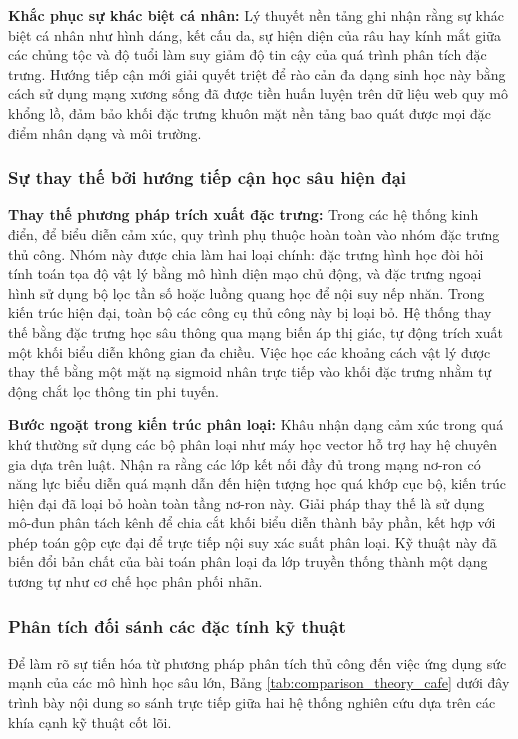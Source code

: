 \textbf{Khắc phục sự khác biệt cá nhân:}
Lý thuyết nền tảng ghi nhận rằng sự khác biệt cá nhân như hình dáng, kết cấu da, sự hiện diện của râu hay kính mắt giữa các chủng tộc và độ tuổi làm suy giảm độ tin cậy của quá trình phân tích đặc trưng. Hướng tiếp cận mới giải quyết triệt để rào cản đa dạng sinh học này bằng cách sử dụng mạng xương sống đã được tiền huấn luyện trên dữ liệu web quy mô khổng lồ, đảm bảo khối đặc trưng khuôn mặt nền tảng bao quát được mọi đặc điểm nhân dạng và môi trường.

\subsubsection{Sự thay thế bởi hướng tiếp cận học sâu hiện đại}

\textbf{Thay thế phương pháp trích xuất đặc trưng:}
Trong các hệ thống kinh điển, để biểu diễn cảm xúc, quy trình phụ thuộc hoàn toàn vào nhóm đặc trưng thủ công. Nhóm này được chia làm hai loại chính: đặc trưng hình học đòi hỏi tính toán tọa độ vật lý bằng mô hình diện mạo chủ động, và đặc trưng ngoại hình sử dụng bộ lọc tần số hoặc luồng quang học để nội suy nếp nhăn. Trong kiến trúc hiện đại, toàn bộ các công cụ thủ công này bị loại bỏ. Hệ thống thay thế bằng đặc trưng học sâu thông qua mạng biến áp thị giác, tự động trích xuất một khối biểu diễn không gian đa chiều. Việc học các khoảng cách vật lý được thay thế bằng một mặt nạ sigmoid nhân trực tiếp vào khối đặc trưng nhằm tự động chắt lọc thông tin phi tuyến.

\textbf{Bước ngoặt trong kiến trúc phân loại:}
Khâu nhận dạng cảm xúc trong quá khứ thường sử dụng các bộ phân loại như máy học vector hỗ trợ hay hệ chuyên gia dựa trên luật. Nhận ra rằng các lớp kết nối đầy đủ trong mạng nơ-ron có năng lực biểu diễn quá mạnh dẫn đến hiện tượng học quá khớp cục bộ, kiến trúc hiện đại đã loại bỏ hoàn toàn tầng nơ-ron này. Giải pháp thay thế là sử dụng mô-đun phân tách kênh để chia cắt khối biểu diễn thành bảy phần, kết hợp với phép toán gộp cực đại để trực tiếp nội suy xác suất phân loại. Kỹ thuật này đã biến đổi bản chất của bài toán phân loại đa lớp truyền thống thành một dạng tương tự như cơ chế học phân phối nhãn.

\subsubsection{Phân tích đối sánh các đặc tính kỹ thuật}

Để làm rõ sự tiến hóa từ phương pháp phân tích thủ công đến việc ứng dụng sức mạnh của các mô hình học sâu lớn, Bảng \ref{tab:comparison_theory_cafe} dưới đây trình bày nội dung so sánh trực tiếp giữa hai hệ thống nghiên cứu dựa trên các khía cạnh kỹ thuật cốt lõi.


